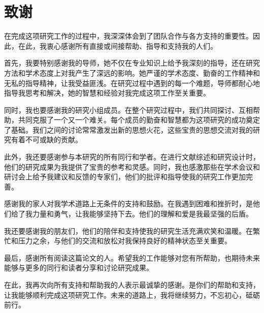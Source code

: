 \chapter[致谢]{致\quad{}谢}

在完成这项研究工作的过程中，我深深体会到了团队合作与各方支持的重要性。因此，在此，我衷心感谢所有直接或间接帮助、指导和支持我的人们。

首先，我要特别感谢我的导师，她不仅在专业知识上给予我深刻的指导，还在研究方法和学术态度上对我产生了深远的影响。她严谨的学术态度、勤奋的工作精神和无私的指导精神，让我受益匪浅。在研究过程中遇到的每一个难题，导师都耐心地指导我思考和解决，她的智慧和经验对我完成这项工作至关重要。

同时，我也要感谢我的研究小组成员。在整个研究过程中，我们共同探讨、互相帮助，共同克服了一个又一个难关。每个成员的勤奋和智慧都为这项研究的成功奠定了基础。我们之间的讨论常常激发出新的思想火花，这些宝贵的思想交流对我的研究有着不可或缺的贡献。

此外，我还要感谢参与本研究的所有同行和学者。在进行文献综述和研究设计时，他们的研究成果为我提供了宝贵的参考和灵感。同时，我也感激那些在学术会议和研讨会上给予我建议和反馈的专家们，他们的批评和指导使我的研究工作更加完善。

感谢我的家人对我学术道路上无条件的支持和鼓励。在我遇到困难和挫折时，是他们给了我力量和勇气，让我能够坚持下去。他们的理解和爱是我最坚强的后盾。

我还要感谢我的朋友们，他们的陪伴和支持使我的研究生活充满欢笑和温暖。在繁忙和压力之余，与他们的交流和放松对我保持良好的精神状态至关重要。

最后，感谢所有阅读这篇论文的人。希望我的工作能够对您有所帮助，也期待未来能够与更多的同行和读者分享和讨论研究成果。

在此，我再次向所有支持和帮助我的人表示最诚挚的感谢。是你们的帮助和支持，让我能够顺利完成这项研究工作。未来的道路上，我将继续努力，不忘初心，砥砺前行。
